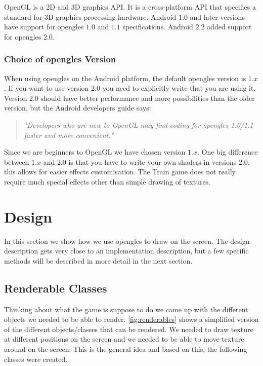 OpenGL is a 2D and 3D graphics API. It is a cross-platform API that specifies a standard for 3D graphics processing hardware. Android $1.0$ and later versions have support for \ac{opengles} $1.0$ and $1.1$ specifications. Android $2.2$ added support for \ac{opengles} $2.0$. \citep{androidopengl, khronosopengles}

\subsubsection*{Choice of \ac{opengles} Version}
When using \ac{opengles} on the Android platform, the default \ac{opengles} version is $1.x$. If you want to use version $2.0$ you need to explicitly write that you are using it. Version $2.0$ should have better performance and more possibilities than the older version, but the Android developers guide says:
\begin{quote}
\textit{"Developers who are new to OpenGL may find coding for \ac{opengles} 1.0/1.1 faster and more convenient."} \citep{androidopengl}
\end{quote}
Since we are beginners to OpenGL we have chosen version $1.x$. One big difference between $1.x$ and $2.0$ is that you have to write your own shaders in versions $2.0$, this allows for easier effects customisation. The Train game does not really require much special effects other than simple drawing of textures.

\section{Design}

In this section we show how we use \ac{opengles} to draw on the screen. The design description gets very close to an implementation description, but a few specific methods will be described in more detail in the next section.

\subsection{Renderable Classes}

Thinking about what the game is suppose to do we came up with the different objects we needed to be able to render. \autoref{fig:renderables} shows a simplified version of the different objects/classes that can be rendered. We needed to draw texture at different positions on the screen and we needed to be able to move texture around on the screen. This is the general idea and based on this, the following classes were created.

